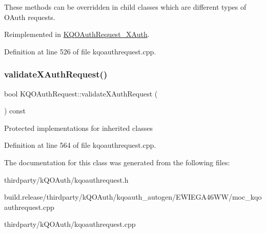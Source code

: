 These methods can be overridden in child classes which are different types of O\+Auth requests. 

Reimplemented in \hyperlink{class_k_q_o_auth_request___x_auth_a16c33c7beb070b6af0e8b126330b239e}{K\+Q\+O\+Auth\+Request\+\_\+\+X\+Auth}.



Definition at line 526 of file kqoauthrequest.\+cpp.

\mbox{\label{class_k_q_o_auth_request_ae9af8b8580c0cc551ad7085a92078cd2}} 
\subsubsection{\texorpdfstring{validate\+X\+Auth\+Request()}{validateXAuthRequest()}}
{\footnotesize\ttfamily bool K\+Q\+O\+Auth\+Request\+::validate\+X\+Auth\+Request (\begin{DoxyParamCaption}{ }\end{DoxyParamCaption}) const\hspace{0.3cm}{\ttfamily [protected]}}

Protected implementations for inherited classes 

Definition at line 564 of file kqoauthrequest.\+cpp.



The documentation for this class was generated from the following files\+:\begin{DoxyCompactItemize}
\item 
thirdparty/k\+Q\+O\+Auth/kqoauthrequest.\+h\item 
build.\+release/thirdparty/k\+Q\+O\+Auth/kqoauth\+\_\+autogen/\+E\+W\+I\+E\+G\+A46\+W\+W/moc\+\_\+kqoauthrequest.\+cpp\item 
thirdparty/k\+Q\+O\+Auth/kqoauthrequest.\+cpp\end{DoxyCompactItemize}
